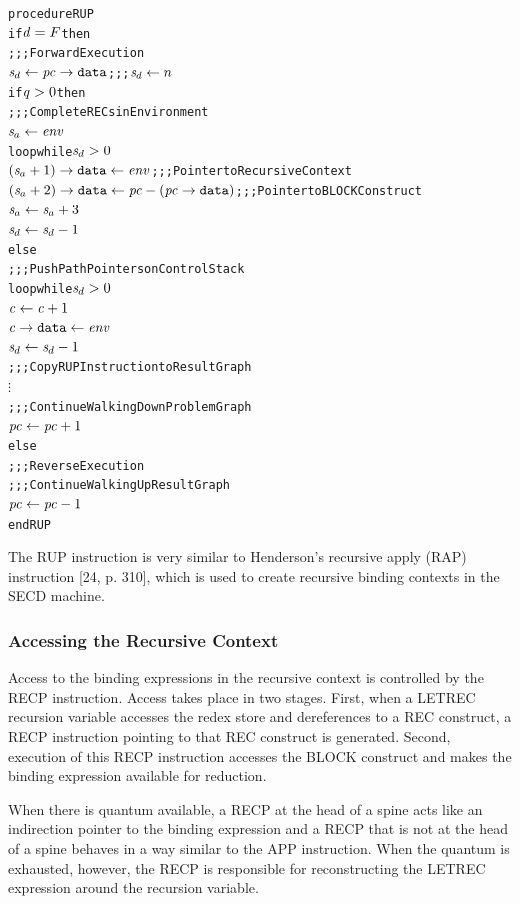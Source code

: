 \par\smallskip\noindent\begin{minipage}{\linewidth}
\begin{alltt}
procedure RUP
  if \(\rt{d} = F\) then
    \textrm{;;; Forward Execution}
    \(\rtsd \leftarrow \rtfield{pc}{data}\)        \textrm{;;; \(\rtsd \leftarrow n\)}
    if \(\rt{q} > 0\) then
      \textrm{;;; Complete RECs in Environment}
      \(\rtsa \leftarrow \rt{env}\)
      loop while \(\rtsd > 0\)
        \((\rtsa+1)\rightarrow\mathtt{data} \leftarrow \rt{env}\)       \textrm{;;; Pointer to Recursive Context}
        \((\rtsa+2)\rightarrow\mathtt{data} \leftarrow \rt{pc}-(\rtfield{pc}{data})\)  \textrm{;;; Pointer to BLOCK Construct}
        \(\rtsa \leftarrow \rtsa+3\)
        \(\rtsd \leftarrow \rtsd-1\)
    else
      \textrm{;;; Push Path Pointers on Control Stack}
      loop while \(\rtsd > 0\)
        \(\rt{c} \leftarrow \rt{c}+1\)
        \(\rtfield{c}{data} \leftarrow \rt{env}\)
        \(\rtsd \leftarrow \rtsd-1\)
      \textrm{;;; Copy RUP Instruction to Result Graph}
      \(\vdots\)
    \textrm{;;; Continue Walking Down Problem Graph}
    \(\rt{pc} \leftarrow \rt{pc}+1\)
  else
    \textrm{;;; Reverse Execution}
    \textrm{;;; Continue Walking Up Result Graph}
    \(\rt{pc} \leftarrow \rt{pc}-1\)
end RUP
\end{alltt}
\end{minipage}\par\smallskip


The RUP instruction is very similar to Henderson's recursive apply (RAP) instruction
[24, p. 310], which is used to create recursive binding contexts in the SECD machine.

\subsubsection*{Accessing the Recursive Context}
Access to the binding expressions in the recursive context is controlled by the RECP
instruction. Access takes place in two stages. First, when a LETREC recursion variable
accesses the redex store and dereferences to a REC construct, a RECP instruction pointing
to that REC construct is generated. Second, execution of this RECP instruction accesses the
BLOCK construct and makes the binding expression available for reduction.


When there is quantum available, a RECP at the head of a spine acts like an indirection
pointer to the binding expression and a RECP that is not at the head of a spine behaves in
a way similar to the APP instruction. When the quantum is exhausted, however, the RECP is
responsible for reconstructing the LETREC expression around the recursion variable.

